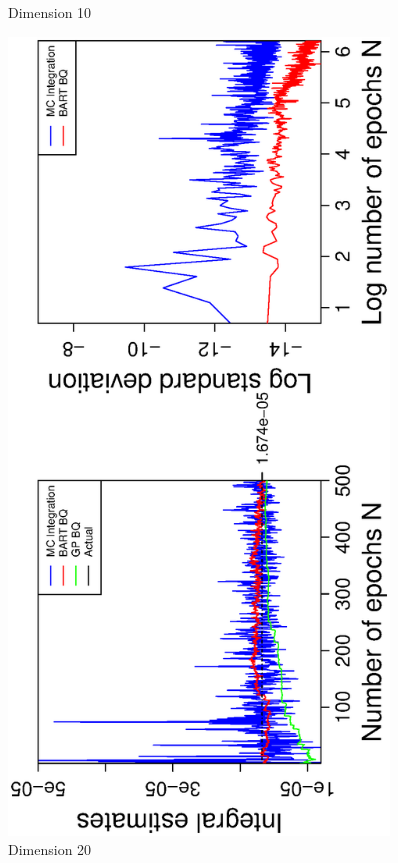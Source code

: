 \begin{figure}[H]
\begin{minipage}[b]{0.4\textwidth}
     \caption{Dimension 10}
  \end{minipage}
    \hspace{1.5cm}
  \begin{minipage}[b]{0.4\textwidth}
    \includegraphics[width= 0.9\textwidth, angle = -90]{report/Figures/2/convergenceMean220Dimensions.eps}
    \vspace{-1cm}
    \caption{Dimension 20}
  \end{minipage}
\end{figure}


